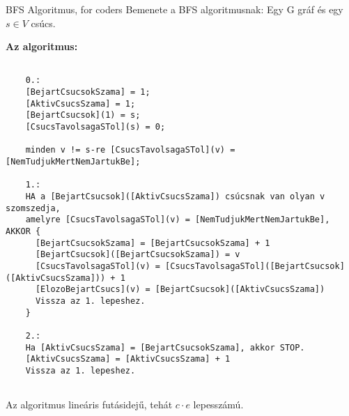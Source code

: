\begin{tetel}{BFS Algoritmus, for coders}
  Bemenete a BFS algoritmusnak: Egy G gráf és egy $s \in V$ csúcs.

  \textbf{Az algoritmus:}
  \begin{lstlisting}

    0.:
    [BejartCsucsokSzama] = 1;
    [AktivCsucsSzama] = 1;
    [BejartCsucsok](1) = s;
    [CsucsTavolsagaSTol](s) = 0;

    minden v != s-re [CsucsTavolsagaSTol](v) = [NemTudjukMertNemJartukBe];

    1.:
    HA a [BejartCsucsok]([AktivCsucsSzama]) csúcsnak van olyan v szomszedja,
    amelyre [CsucsTavolsagaSTol](v) = [NemTudjukMertNemJartukBe], AKKOR {
      [BejartCsucsokSzama] = [BejartCsucsokSzama] + 1
      [BejartCsucsok]([BejartCsucsokSzama]) = v
      [CsucsTavolsagaSTol](v) = [CsucsTavolsagaSTol]([BejartCsucsok]([AktivCsucsSzama])) + 1
      [ElozoBejartCsucs](v) = [BejartCsucsok]([AktivCsucsSzama])
      Vissza az 1. lepeshez.
    }

    2.:
    Ha [AktivCsucsSzama] = [BejartCsucsokSzama], akkor STOP.
    [AktivCsucsSzama] = [AktivCsucsSzama] + 1
    Vissza az 1. lepeshez.


  \end{lstlisting}
  Az algoritmus lineáris futásidejű, tehát $c \cdot e$ lepesszámú.

\end{tetel}


